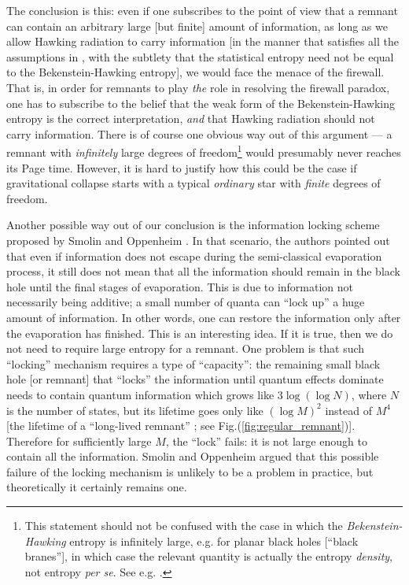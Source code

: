 \documentclass[12pt]{article}
\newcommand{\2}{$^2$}
\newcommand{\3}{$^3$}
\newcommand{\4}{$_4$}
\newcommand{\5}{$_5$}
\begin{document}
The conclusion is this: even if one subscribes to the point of view that a remnant can contain an arbitrary large [but finite] amount of information, as long as we allow Hawking radiation to carry information [in the manner that satisfies all the assumptions in \cite{amps}, with the subtlety that the statistical entropy need not be equal to the Bekenstein-Hawking entropy], we would face the menace of the firewall. That is, in order for remnants to play \emph{the} role in resolving the firewall paradox, one has to subscribe to the belief that the weak form of the Bekenstein-Hawking entropy is the correct interpretation, \emph{and} that Hawking radiation should not carry information. There is of course one obvious way out of this argument --- a remnant with \emph{infinitely} large degrees of freedom\footnote{This statement should not be confused with the case in which the \emph{Bekenstein-Hawking} entropy is infinitely large, e.g. for planar black holes [``black branes''], in which case the relevant quantity is actually the entropy \emph{density}, not entropy \emph{per se}. See e.g. \cite{kn:son}.} would presumably never reaches its Page time. However, it is hard to justify how this could be the case if gravitational collapse starts with a typical \emph{ordinary} star with \emph{finite} degrees of freedom. 

Another possible way out of our conclusion is the information locking scheme proposed by Smolin and Oppenheim \cite{SmoOpp}. In that scenario, the authors pointed out that even if information does not escape during the semi-classical evaporation process, it still does not mean that all the
information should remain in the black hole until the final stages of evaporation. This is due to information not necessarily being additive; a small number
of quanta can ``lock up'' a huge amount of information. In other words, one can restore the information only after the evaporation has finished. This is an interesting idea. If it is true, then we do not need to require large entropy for a remnant. One problem is that such ``locking'' mechanism requires a type of ``capacity'': the remaining small black hole [or remnant] that ``locks'' the information until quantum effects dominate needs to contain quantum information which grows like $3 \log(\log N)$, where $N$ is the number of states, but its lifetime goes only like $(\log M)^2$ instead of $M^4$ [the lifetime of  a ``long-lived remnant'' \cite{CW}; see Fig.(\ref{fig:regular_remnant})]. Therefore for sufficiently large $M$, the ``lock'' fails: it is not large enough to contain all the information. Smolin and Oppenheim argued that this possible failure of the locking mechanism is unlikely to be a problem in practice, but theoretically it certainly remains one.
\end{document}
